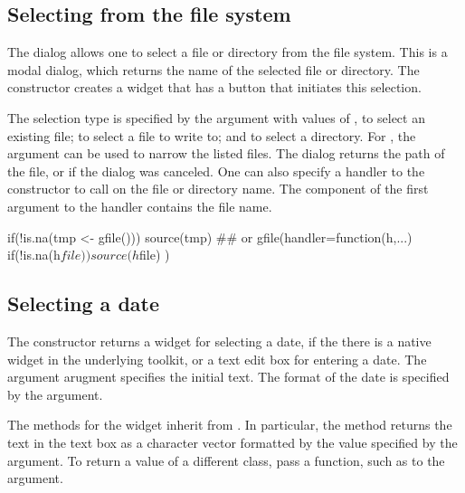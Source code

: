 \subsection{Selecting from the file system}
\label{sec:gWidgets-selecting-from-file}

The  dialog allows one to select a file or directory
from the file system. This is a modal dialog, which returns the name
of the selected file or directory. The 
constructor creates a widget that has a button that
initiates this selection.  

The selection type is specified by the  argument with
values of , to select an existing file;  to
select a file to write to; and  to select a
directory. For , the  argument can
be used to narrow the listed files. The dialog returns the path of the
file, or  if the dialog was canceled. One can also specify a
handler to the constructor to call on the file or directory name. The
component  of the first argument to the handler contains
the file name.

\begin{Schunk}
\begin{Sinput}
 if(!is.na(tmp <- gfile())) 
   source(tmp)
 ## or
 gfile(handler=function(h,...) {
   if(!is.na(h$file))
     source(h$file) 
 })   
\end{Sinput}
\end{Schunk}


\subsection{Selecting a date}
\label{sec:gWidgets-selecting-date}

The  constructor returns a widget for selecting
a date, if the there is a native widget in the underlying toolkit,
or a text edit box for entering a date. The argument
 arugment specifies the initial
text. The format of the date is specified by the
 argument.

The methods for the widget inherit from . In particular,
the  method returns the text in the text box
as a character vector formatted by the value specified by the
 argument. To return a value of a
different class, pass a function, such as  to the
 argument.




